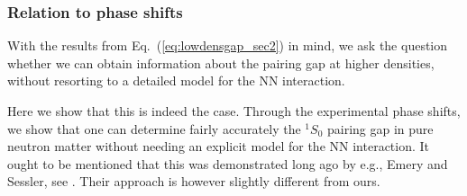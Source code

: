 \documentclass[rmp,aps,floatfix]{revtex4}
\begin{document}
\subsubsection{Relation to phase shifts}

With the results from Eq.~(\ref{eq:lowdensgap_sec2}) in mind, we ask the
question whether we can obtain information about the 
pairing gap at higher densities, without resorting to a detailed model
for the NN interaction. 

Here we show that this is indeed the case.
Through the experimental phase shifts, we show that one can determine
fairly accurately the $^1S_0$ pairing gap in pure neutron matter
without needing an explicit model for the NN interaction. 
It ought to be mentioned that this was demonstrated long ago 
by e.g., Emery and Sessler, see \cite{emerysessler}. 
Their approach is however slightly different from ours.
\end{document}
